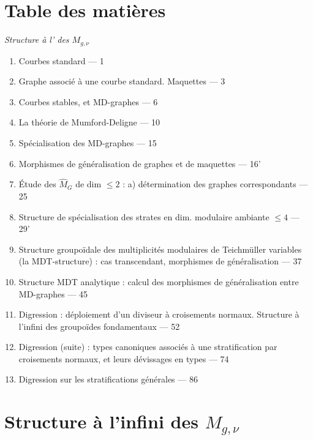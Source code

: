 \documentclass[11pt,a4paper]{article}
\begin{document}
\section{Table des matières}


\emph{Structure à l'\uncertain{$\infty$} des $M_{g,\nu}$}

\begin{enumerate}
  \item Courbes standard — 1
  \item Graphe associé à une courbe standard. Maquettes — 3
  \item Courbes stables, et MD-graphes — 6
  \item La théorie de Mumford-Deligne — 10
  \item Spécialisation des MD-graphes — 15
  \item Morphismes de généralisation de graphes et de maquettes — 16'
  \item Étude des $\widehat{M}_{G}$ de dim $\leq 2$ : a) détermination des graphes correspondants — 25
  \item Structure de spécialisation des strates en dim. modulaire ambiante $\leq 4$ — 29'
  \item Structure groupoïdale des multiplicités modulaires de Teichmüller variables (la MDT-structure) : cas transcendant, morphismes de généralisation — 37
  \item Structure MDT analytique : calcul des morphismes de généralisation entre MD-graphes — 45
  \item Digression : déploiement d'un diviseur à croisements normaux. Structure à l'infini des groupoïdes fondamentaux — 52
  \item Digression (suite) : types canoniques associés à une stratification par croisements normaux, et leurs dévissages en types  — 74
  \item Digression sur les stratifications  générales — 86
\end{enumerate}

\section{Structure à l'infini des $M_{g,\nu}$}

\end{document}
